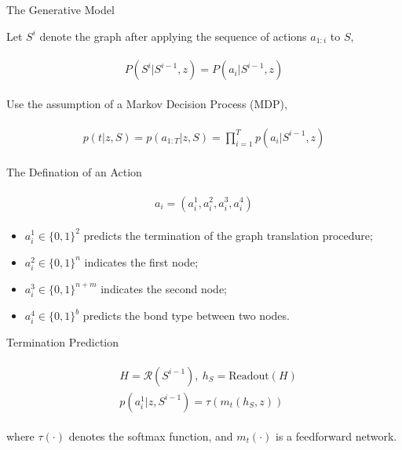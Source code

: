 \documentclass{beamer}		%
\begin{document}
\begin{frame}{The Generative Model}


Let $S^i$ denote the graph after applying the sequence of actions $a_{1:i}$ to $S$,

\begin{eqnarray*}
\begin{aligned}
P(S^i|S^{i-1},z) = P(a_i|S^{i-1},z)
\end{aligned}    
\end{eqnarray*}

\pause

Use the assumption of a Markov Decision Process (MDP),

\begin{eqnarray}
\begin{aligned}
p(t|z,S) = p(a_{1:T}|z, S) = \prod_{i=1}^{T} p(a_i|S^{i-1}, z)
\end{aligned}    
\end{eqnarray}

\end{frame}








\begin{frame}{The Defination of an Action}

\begin{eqnarray}
\begin{aligned}
a_i = (a_i^1,a_i^2,a_i^3,a_i^4)
\end{aligned}    
\end{eqnarray}

\begin{itemize}
    \item $a_i^1 \in \{0, 1\}^2$ predicts the termination of the graph translation procedure;
    \item $a_i^2 \in \{0, 1\}^n$ indicates the first node;
    \item $a_i^3 \in \{0, 1\}^{n+m}$ indicates the second node;
    \item $a_i^4 \in \{0, 1\}^{b}$ predicts the bond type between two nodes.
\end{itemize}


\end{frame}





\begin{frame}{Termination Prediction}

\begin{eqnarray*}
\begin{aligned}
&H = \mathcal{R}(S^{i-1}),\ h_S = \text{Readout}(H) \\
&p(a_i^1|z, S^{i-1})=\tau(m_t(h_S, z))
\end{aligned}    
\end{eqnarray*}

where $\tau(\cdot)$ denotes the softmax function, and $m_t(\cdot)$ is a feedforward network.

\end{frame}
\end{document}
